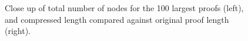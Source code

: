 
\begin{figure}
\centering
\caption{Close up of total number of nodes for the 100 largest proofs (left), and compressed length compared against original proof length (right).}
\label{fig:ex3}
\end{figure}



